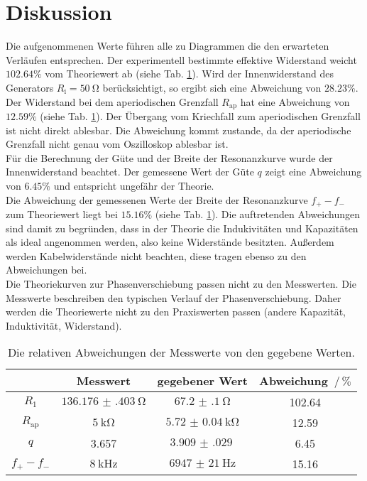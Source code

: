 \section{Diskussion}
\label{sec:Diskussion}
Die aufgenommenen Werte führen alle zu Diagrammen die den erwarteten Verläufen entsprechen.
Der experimentell bestimmte effektive Widerstand weicht $102.64 \%$ vom Theoriewert ab (siehe Tab. \ref{tab:fehler}).
Wird der Innenwiderstand des Generators $R_\text{i}=\SI{50}{\ohm}$ berücksichtigt, so ergibt sich eine Abweichung von $28.23 \%$.
\\
Der Widerstand bei dem aperiodischen Grenzfall $R_\text{ap}$ hat eine Abweichung von $12.59 \%$ (siehe Tab. \ref{tab:fehler}).
Der Übergang vom Kriechfall zum aperiodischen Grenzfall ist nicht direkt ablesbar.
Die Abweichung kommt zustande, da der aperiodische Grenzfall nicht genau vom Oszilloskop ablesbar ist.
\\
Für die Berechnung der Güte und der Breite der Resonanzkurve wurde der Innenwiderstand beachtet.
Der gemessene Wert der Güte $q$ zeigt eine Abweichung von $6.45 \%$ und entspricht ungefähr der Theorie.
\\
Die Abweichung der gemessenen Werte der Breite der Resonanzkurve $f_+ - f_-$ zum Theoriewert liegt bei $15.16 \%$ (siehe Tab. \ref{tab:fehler}).
Die auftretenden Abweichungen sind damit zu begründen, dass in der Theorie die Indukivitäten und Kapazitäten als ideal angenommen werden, also keine Widerstände besitzten.
Außerdem werden Kabelwiderstände nicht beachten, diese tragen ebenso zu den Abweichungen bei.
\\
Die Theoriekurven zur Phasenverschiebung passen nicht zu den Messwerten.
Die Messwerte beschreiben den typischen Verlauf der Phasenverschiebung.
Daher werden die Theoriewerte nicht zu den Praxiswerten passen (andere Kapazität, Induktivität, Widerstand).
\begin{table}
\centering
\caption{Die relativen Abweichungen der Messwerte von den gegebene Werten.}
\begin{tabular}{cccc}
\toprule
 & Messwert & gegebener Wert & Abweichung $ \,/\, \%$ \\
\midrule
$R_1$ &  $\SI{136.176(403)}{\ohm}$ & $\SI{67.2(1)}{\ohm}$ & 102.64 \\
$R_\text{ap}$ & $\SI{5}{\kilo\ohm}$ & $\SI{5.72(4)}{\kilo\ohm}$ & 12.59 \\
$q$ & 3.657 & $\SI{3.909(029)}{}$ & 6.45 \\
$f_{+}- f_{-}$ & $\SI{8}{\kilo\hertz}$ & $\SI{6947(21)}{\hertz}$ & 15.16 \\
\bottomrule
\end{tabular}
\label{tab:fehler}
\end{table}